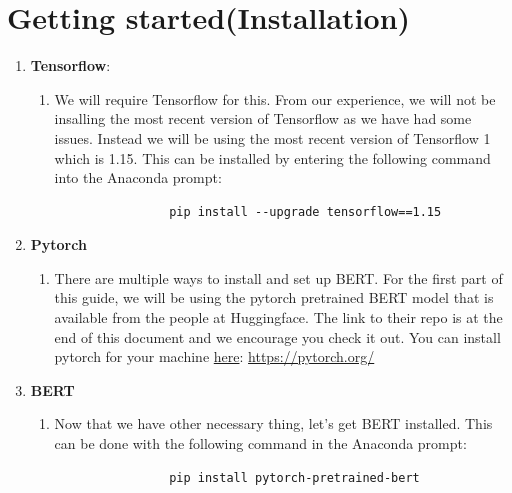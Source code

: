\documentclass{article}
\begin{document}
\section*{Getting started(Installation)}
\begin{enumerate}
    \item \textbf{Tensorflow}:
    \begin{enumerate}
        \item[] We will require Tensorflow for this. From our experience, we will not be insalling the most recent version of Tensorflow as we have had some issues. Instead we will be using the most recent version of Tensorflow 1 which is 1.15.  This can be installed by entering the following command into the Anaconda prompt:
        
        \begin{center}
            \begin{verbatim}
                pip install --upgrade tensorflow==1.15
            \end{verbatim}
        \end{center}
    \end{enumerate}
    \item \textbf{Pytorch}
    \begin{enumerate}
        \item[] There are multiple ways to install and set up BERT. For the first part of this guide, we will be using the pytorch pretrained BERT model that is available from the people at Huggingface. The link to their repo is at the end of this document and we encourage you check it out. 
        You can install pytorch for your machine \href{https://pytorch.org/}{here}: \url{https://pytorch.org/}
    \end{enumerate}
    
    \item \textbf{BERT}
    \begin{enumerate}
        \item[] Now that we have other necessary thing, let's get BERT installed. This can be done with the following command in the Anaconda prompt:
        \begin{center}
            \begin{verbatim}
                pip install pytorch-pretrained-bert
            \end{verbatim}
        \end{center}
    \end{enumerate}
\end{enumerate}
\end{document}
